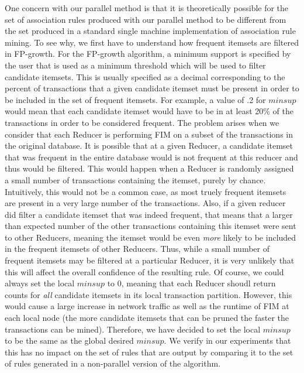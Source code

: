 \documentclass[11pt]{article}
\begin{document}
One concern with our parallel method is that it is theoretically
possible for the set of association rules produced with our parallel
method to be different from the set produced in a standard single
machine implementation of association rule mining. To see why, we
first have to understand how frequent itemsets are filtered in
FP-growth. For the FP-growth algorithm, a minimum support is specified
by the user that is used as a minimum threshold which will be used to
filter candidate itemsets. This is usually specified as a decimal
corresponding to the percent of transactions that a given candidate
itemset must be present in order to be included in the set of frequent
itemsets. For example, a value of .2 for $minsup$ would mean that
each candidate itemset would have to be in at least 20\% of the
transactions in order to be considered frequent. The problem arises
when we consider that each Reducer is performing FIM on a subset of
the transactions in the original database. It is possible that at a
given Reducer, a candidate itemset that was frequent in the entire
database would is not frequent at this reducer and thus would be
filtered. This would happen when a Reducer is randomly assigned a
small number of transactions containing the itemset, purely by
chance. Intuitively, this would not be a common case, as most truely
frequent itemsets are present in a very large number of the
transactions. Also, if a given reducer did filter a candidate itemset
that was indeed frequent, that means that a larger than expected
number of the other transactions containing
this itemset were sent to other Reducers, meaning the itemset would be
even \emph{more} likely to be included in the frequent itemsets of
other Reducers. Thus, while a small number of frequent itemsets may be
filtered at a particular Reducer, it is very unlikely that this will
affect the overall confidence of the resulting rule. Of course, we
could always set the local $minsup$ to 0, meaning that each Reducer
shoudl return counts for \emph{all} candidate itemsets in its local
transaction partition. However, this would cause a large increase in
network traffic as well as the runtime of FIM at each local node (the
more candidate itemsets that can be pruned the faster the transactions
can be mined).  Therefore, we have decided to set the local $minsup$
to be the same as the global desired $minsup$. We verify in our
experiments that this has no impact on the set of rules that are
output by comparing it to the set of rules generated in a non-parallel
version of the algorithm. 
\end{document}
